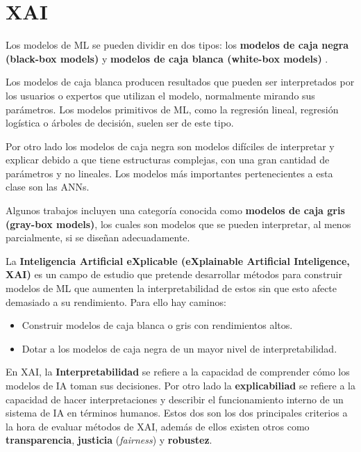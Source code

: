 \section{XAI}

Los modelos de ML se pueden dividir en dos tipos: los \textbf{modelos de caja negra (black-box models)} y \textbf{modelos de caja blanca (white-box models)} \cite{XAIWHATWEKNOW, XAINOTIONS}.

 Los modelos de caja blanca producen resultados que pueden ser interpretados por los usuarios o expertos que utilizan el modelo, normalmente mirando sus parámetros. Los modelos primitivos de ML, como la regresión lineal, regresión logística o árboles de decisión, suelen ser de este tipo. 
 
Por otro lado los modelos de caja negra son modelos difíciles de interpretar y explicar debido a que tiene estructuras complejas, con una gran cantidad de parámetros y no lineales. Los modelos más importantes pertenecientes a esta clase son las ANNs. 

Algunos trabajos incluyen una categoría conocida como \textbf{modelos de caja gris (gray-box models)}, los cuales son modelos que se pueden interpretar, al menos parcialmente, si se diseñan adecuadamente.


La \textbf{Inteligencia Artificial eXplicable (eXplainable Artificial Inteligence, XAI)} \cite{XAIManifesto, XAIWHATWEKNOW, XAINOTIONS, XAICONCEPTS} es un campo de estudio que pretende desarrollar métodos para construir modelos de ML que aumenten la interpretabilidad de estos sin que esto afecte demasiado a su rendimiento. Para ello hay caminos:

\begin{itemize}
\item Construir modelos de caja blanca o gris con rendimientos altos.
\item Dotar a los modelos de caja negra de un mayor nivel de interpretabilidad.
\end{itemize}

En XAI, la \textbf{Interpretabilidad} se refiere a la capacidad de comprender cómo los modelos de IA toman sus decisiones. Por otro lado la \textbf{explicabiliad} se refiere a la capacidad de hacer interpretaciones y describir el funcionamiento interno de un sistema de IA en términos humanos. Estos dos son los dos principales criterios a la hora de evaluar métodos de XAI, además de ellos existen otros como \textbf{transparencia}, \textbf{justicia} (\textit{fairness}) y \textbf{robustez}. 

